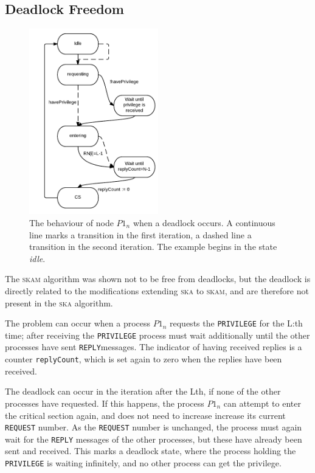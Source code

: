 \documentclass[a4paper,10pt]{llncs}
\begin{document}
\subsection{Deadlock Freedom}
\label{sec:deadlock}
\begin{figure}[]
\begin{center}
\includegraphics[width=0.5\textwidth]{Deadlock.pdf}
 \caption[Close up of \textit{Hemidactylus} sp.]
   {The behaviour of node $P1_n$ when a deadlock occurs. A continuous line marks a transition in the first iteration, a dashed line a transition in the second iteration. The example begins in the state \emph{idle}.}
\end{center}
\end{figure}

The \textsc{skam} algorithm was shown not to be free from deadlocks, but the deadlock is directly related to the modifications extending \textsc{ska} to \textsc{skam}, and are therefore not present in the \textsc{ska} algorithm.

The problem can occur when a process $P1_n$ requests the \texttt{PRIVILEGE} for the L:th time; after receiving the \texttt{PRIVILEGE} process must wait additionally until the other processes have sent \texttt{REPLY}messages. The indicator of having received replies is a counter \texttt{replyCount}, which is set again to zero when the replies have been received.

The deadlock can occur in the iteration after the Lth, if none of the other processes have requested. If this happens, the process $P1_n$ can attempt to enter the critical section again, and does not need to increase increase its current \texttt{REQUEST} number. As the \texttt{REQUEST} number is unchanged, the process must again wait for the \texttt{REPLY} messages of the other processes, but these have already been sent and received. This marks a deadlock state, where the process holding the \texttt{PRIVILEGE} is waiting infinitely, and no other process can get the privilege. 
\end{document}
